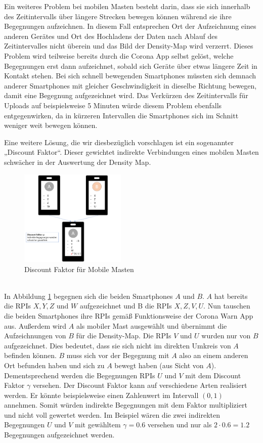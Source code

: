\documentclass[conference,compsoc]{IEEEtran}
\begin{document}
Ein weiteres Problem bei mobilen Masten besteht darin, dass sie sich innerhalb des Zeitintervalls über längere Strecken bewegen können während sie ihre Begegnungen aufzeichnen.
In diesem Fall entsprechen Ort der Aufzeichnung eines anderen Gerätes und Ort des Hochladens der Daten nach Ablauf des Zeitintervalles nicht überein und das Bild der Density-Map wird verzerrt. 
Dieses Problem wird teilweise bereits durch die Corona App selbst gelöst, welche Begegnungen erst dann aufzeichnet, sobald sich Geräte über etwas längere Zeit in Kontakt stehen. 
Bei sich schnell bewegenden Smartphones müssten sich demnach anderer Smartphones mit gleicher Geschwindigkeit in dieselbe Richtung bewegen, damit eine Begegnung aufgezeichnet wird. 
Das Verkürzen des Zeitintervalls für Uploads auf beispielsweise 5 Minuten würde diesem Problem ebenfalls entgegenwirken, da in kürzeren Intervallen die Smartphones sich im Schnitt weniger weit bewegen können.

Eine weitere Lösung, die wir diesbezüglich vorschlagen ist ein sogenannter „Discount Faktor“. 
Dieser gewichtet indirekte Verbindungen eines mobilen Masten schwächer in der Auswertung der Density Map. \\
\begin{figure}[h]
	\centering
	\includegraphics[width=0.45\textwidth]{"Discount_Faktor"}
	\caption{Discount Faktor für Mobile Masten}
	\label{disc_factor}
\end{figure} \\
In Abbildung \ref{disc_factor} begegnen sich die beiden Smartphones $A$ und $B$. $A$ hat bereits die RPIs $X, Y, Z$ und $W$ aufgezeichnet und B die RPIs $X, Z, V, U$. 
Nun tauschen die beiden Smartphones ihre RPIs gemäß Funktionsweise der Corona Warn App aus. Außerdem wird $A$ als mobiler Mast ausgewählt und übernimmt die Aufzeichnungen von $B$ für die Density-Map.
Die RPIs $V$ und $U$ wurden nur von $B$ aufgezeichnet. Dies bedeutet, dass sie sich nicht im direkten Umkreis von $A$ befinden können. $B$ muss sich vor der Begegnung mit $A$ also an einem anderen Ort befunden haben und sich zu $A$ bewegt haben (aus Sicht von $A$).
Dementsprechend werden die Begegnungen RPIs $U$ und $V$ mit dem Discount Faktor $\gamma$ versehen.
Der Discount Faktor kann auf verschiedene Arten realisiert werden. Er könnte beispielsweise einen Zahlenwert im Intervall $(0,1)$ annehmen. 
Somit würden indirekte Begegnungen mit dem Faktor multipliziert und nicht voll gewertet werden. Im Beispiel wären die zwei indirekten Begegnungen $U$ und $V$ mit gewähltem $\gamma = 0.6$ versehen und nur als $2 \cdot 0.6 = 1.2$ Begegnungen aufgezeichnet werden.
\end{document}
